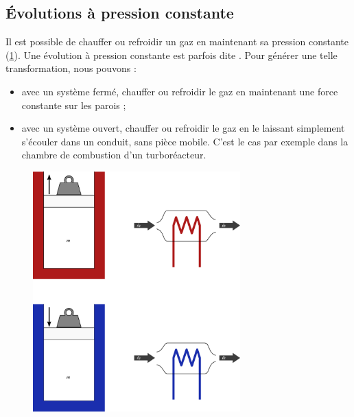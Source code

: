 	\subsection{Évolutions à pression constante}
	\label{ch_gp_isobares}

		Il est possible de chauffer ou refroidir un gaz en maintenant sa pression constante (\cref{fig_gp_pression_constante}). Une évolution à pression constante est parfois dite . Pour générer une telle transformation, nous pouvons :
		
		\begin{itemize}
			\item avec un système fermé, chauffer ou refroidir le gaz en maintenant une force constante sur les parois ;
			\item avec un système ouvert, chauffer ou refroidir le gaz en le laissant simplement s’écouler dans un conduit, sans pièce mobile. C’est le cas par exemple dans la chambre de combustion d’un turboréacteur.
		\end{itemize}

		\begin{figure}
			\begin{center}
				\includegraphics[width=8cm]{images/pression_constante.png}
			\end{center}
			\label{fig_gp_pression_constante}
		\end{figure}
		
